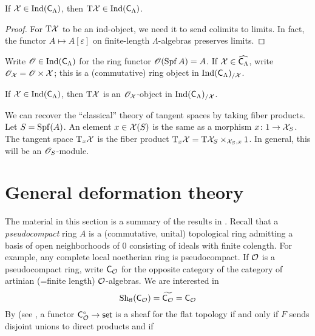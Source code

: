 \documentclass[phd,cornellheadings,draft]{cornell}
\begin{document}
\begin{theorem}
If $\mathcal{X}\in \operatorname{Ind}(\mathsf{C}_\Lambda)$, then 
$\mathrm{T}\mathcal{X}\in \operatorname{Ind}(\mathsf{C}_\Lambda)$. 
\end{theorem}
\begin{proof}
For $\mathrm{T}\mathcal{X}$ 
to be an ind-object, we need it to send colimits to limits. In fact, the 
functor $A\mapsto A[\varepsilon]$ on finite-length $\Lambda$-algebras preserves 
limits.
\end{proof}

Write $\mathscr{O}\in \operatorname{Ind}(\mathsf{C}_\Lambda)$ for the ring functor 
$\mathscr{O}(\operatorname{Spf} A) = A$. If $\mathcal{X}\in \widehat{\mathsf{C}_\Lambda}$, write 
$\mathscr{O}_{\mathcal{X}} = \mathscr{O}\times \mathcal{X}$; this is a (commutative) ring object in 
$\operatorname{Ind}(\mathsf{C}_\Lambda)_{/\mathcal{X}}$. 

\begin{theorem}
If $\mathcal{X}\in \operatorname{Ind}(\mathsf{C}_\Lambda)$, then $\mathrm{T}\mathcal{X}$ is an 
$\mathscr{O}_{\mathcal{X}}$-object in $\operatorname{Ind}(\mathsf{C}_\Lambda)_{/\mathcal{X}}$. 
\end{theorem}

We can recover the ``classical'' theory of tangent spaces by taking fiber 
products. Let $S=\operatorname{Spf}(A)$. An element $x\in \mathcal{X}(S)$ is the same as 
a morphism $x\colon 1\to \mathcal{X}_S$. The tangent space $\mathrm{T}_x \mathcal{X}$ is the fiber 
product $\mathrm{T}_x \mathcal{X} = \mathrm{T} \mathcal{X}_S\times_{\mathcal{X}_S,x} 1$. In general, this 
will be an $\mathscr{O}_S$-module. 



\section{General deformation theory}

The material in this section is a summary of the results in 
\cite[7\textsubscript{b} \S0--2]{sga3-i}. Recall that a \emph{pseudocompact} 
ring $A$ is a (commutative, unital) topological ring admitting a basis of 
open neighborhoods of $0$ consisting of ideals with finite colength. For 
example, any complete local noetherian ring is pseudocompact. If 
$\mathcal{O}$ is a pseudocompact ring, write $\mathsf{C}_{\mathcal{O}}$ for the opposite category 
of the category of artinian (=finite length) $\mathcal{O}$-algebras. We are interested 
in 
\[
  \mathrm{Sh}_\mathrm{fl}(\mathsf{C}_{\mathcal{O}}) = \widetilde{\mathsf{C}_{\mathcal{O}}} = \mathsf{C}_{\mathcal{O}}
\]
By \cite[IV 4.3.5]{sga3-i} (see \cite[VII\textsubscript{B} 1.5]{sga3-i}, a 
functor $\mathsf{C}_{\mathcal{O}}^\circ\to\mathsf{set}$ is a sheaf for the flat topology if and 
only if $F$ sends disjoint unions to direct products and if 
\end{document}

